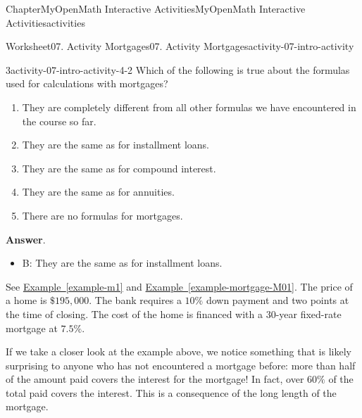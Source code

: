 \documentclass[oneside,10pt,]{book}
\newcommand{\blocktitlefont}{\relax}
\newcommand{\xreffont}{\relax}
\newcommand{\ptxlistdisc}{\raisebox{0.3ex}{\textbullet}}
\newlength{\fillinmaxwidth}
\newlength{\fillincontract}
\newlength{\charmaxwidth}\setlength{\charmaxwidth}{0.5em}
\newlength{\charminwidth}\setlength{\charminwidth}{0.1em}
\newlength{\fillinheight}
\newcommand{\fillintext}[1]{%
\setlength{\fillinmaxwidth}{#1\charmaxwidth}%
\setlength{\fillincontract}{#1\charminwidth}%
\setlength{\fillinheight}{\baselineskip}\addtolength{\fillinheight}{1.2pt}%
\strut\nobreak\leaders\vbox{\hrule width 0.3pt height 0.3pt \vskip -1.2pt}\hskip 1\fillinmaxwidth minus \fillincontract\nobreak\strut%
}
\begin{document}
\begin{chapterptx}{Chapter}{MyOpenMath Interactive Activities}{}{MyOpenMath Interactive Activities}{}{}{activities}
\begin{worksheet-section}{Worksheet}{07. Activity Mortgages}{}{07. Activity Mortgages}{}{}{activity-07-intro-activity}
%
\begin{divisionexercise}{3}{}{}{activity-07-intro-activity-4-2}%
Which of the following is true about the formulas used for calculations with mortgages?%
\par
%
\begin{enumerate}[label={(\alph*)}]
\item{}They are completely different from all other formulas we have encountered in the course so far.%
\item{}They are the same as for installment loans.%
\item{}They are the same as for compound interest.%
\item{}They are the same as for annuities.%
\item{}There are no formulas for mortgages.%
\end{enumerate}
%
\par\smallskip%
\noindent\textbf{\blocktitlefont Answer}.\hypertarget{activity-07-intro-activity-4-2-2}{}\quad{}%
\begin{itemize}[label=\ptxlistdisc]
\item{}B: They are the same as for installment loans.%
\end{itemize}
%
\end{divisionexercise}%
\clearpage
See \hyperref[example-m1]{Example~{\xreffont\ref{example-m1}}} and \hyperref[example-mortgage-M01]{Example~{\xreffont\ref{example-mortgage-M01}}}. The price of a home is \(\$195,000\). The bank requires a \(10\%\) down payment and two points at the time of closing. The cost of the home is financed with a \(30\)-year fixed-rate mortgage at \(7.5\%\).%
\par
If we take a closer look at the example above, we notice something that is likely surprising to anyone who has not encountered a mortgage before: more than half of the amount paid covers the interest for the mortgage! In fact, over \(60\%\) of the total paid covers the interest. This is a consequence of the long length of the mortgage.%

\end{worksheet-section}
\end{chapterptx}
\end{document}

